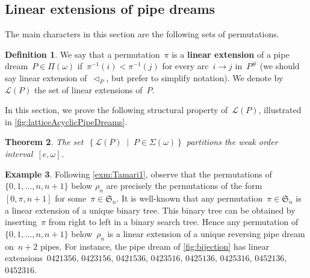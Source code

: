 \documentclass[reqno]{amsart}
\newtheorem{theorem}{Theorem}[section]
\theoremstyle{definition}
\newtheorem{definition}[theorem]{Definition}
\newtheorem{example}[theorem]{Example}
\newcommand{\set}[2]{\left\{ #1 \;\middle|\; #2 \right\}} %
\newcommand{\ie}{\textit{i.e.}~} %
\newcommand{\defn}[1]{\textbf{\textsf{\color{PineGreen} #1}}} %
\newcommand{\fS}{\mathfrak{S}} %
\newcommand{\pipeDreams}{\Pi} %
\newcommand{\contact}{^\#} %
\newcommand{\acyclicPipeDreams}{\Sigma} %
\newcommand{\linearExtensions}{\mathcal{L}} %
\newcommand{\less}{\vartriangleleft} %
\newcommand{\contactLess}[1]{\less_{#1}} %
\begin{document}
\subsection{Linear extensions of pipe dreams}
\label{subsec:linearExtensions}

The main characters in this section are the following sets of permutations.


\begin{definition}
\label{def:linearExtensions}
We say that a permutation~$\pi$ is a \defn{linear extension} of a pipe dream~$P \in \pipeDreams(\omega)$ if~$\pi^{-1}(i) < \pi^{-1}(j)$ for every arc~$i \to j$ in~$P\contact$ (we should say linear extension of~$\contactLess{P}$, but prefer to simplify notation).
We denote by~$\linearExtensions(P)$ the set of linear extensions of~$P$.
\end{definition}

In this section, we prove the following structural property of~$\linearExtensions(P)$, illustrated in \cref{fig:latticeAcyclicPipeDreams}.

\begin{theorem}
\label{thm:partitionPipeDreams}
The set~$\set{\linearExtensions(P)}{P \in \acyclicPipeDreams(\omega)}$ partitions the weak order interval~$[e,\omega]$.
\end{theorem}

\begin{example}
\label{exm:Tamari2}
Following \cref{exm:Tamari1}, observe that the permutations of~$\{0, 1, \dots, n, n+1\}$ below $\rho_n$ are precisely the permutations of the form~$[0, \pi, n+1]$ for some~$\pi \in \fS_n$.
It is well-known that any permutation~$\pi \in \fS_n$ is a linear extension of a unique binary tree.
This binary tree can be obtained by inserting~$\pi$ from right to left in a binary search tree.
Hence any permutation of~$\{0, 1, \dots, n, n+1\}$ below~$\rho_n$ is a linear extension of a unique reversing pipe dream on~$n+2$ pipes.
For instance, the pipe dream of \cref{fig:bijection} has linear extensions~$0421356$, $0423156$, $0421536$, $0423516$, $0425136$, $0425316$, $0452136$, $0452316$.
\end{example}
\end{document}
